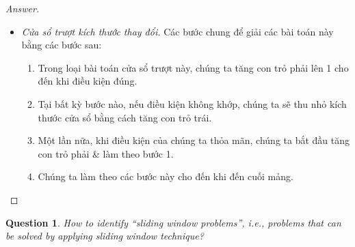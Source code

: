 \documentclass{article}
\newtheorem{question}{Question}
\begin{document}
\begin{proof}[Answer]
\begin{itemize}
\begin{enumerate}
            \item Sau đó, sử dụng vòng lặp để trượt cửa sổ đi 1 \& tiếp tục tính kết quả theo từng cửa sổ.
        \end{enumerate}
        \item {\it Cửa sổ trượt kích thước thay đổi.} Các bước chung để giải các bài toán này bằng các bước sau:
        \begin{enumerate}
            \item Trong loại bài toán cửa sổ trượt này, chúng ta tăng con trỏ phải lên 1 cho đến khi điều kiện đúng.
            \item Tại bất kỳ bước nào, nếu điều kiện không khớp, chúng ta sẽ thu nhỏ kích thước cửa sổ bằng cách tăng con trỏ trái.
            \item Một lần nữa, khi điều kiện của chúng ta thỏa mãn, chúng ta bắt đầu tăng con trỏ phải \& làm theo bước 1.
            \item Chúng ta làm theo các bước này cho đến khi đến cuối mảng.
        \end{enumerate}
    \end{itemize}
\end{proof}

\begin{question}
    How to identify ``sliding window problems'', i.e., problems that can be solved by applying sliding window technique?
\end{question}
\end{document}
